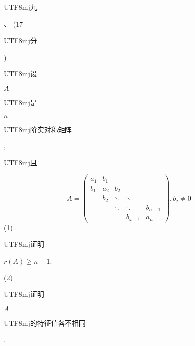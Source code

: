 \documentclass[10pt]{article}
\begin{document}
\begin{CJK}{UTF8}{mj}九\end{CJK}、 $(17$ \begin{CJK}{UTF8}{mj}分\end{CJK}) \begin{CJK}{UTF8}{mj}设\end{CJK} $A$ \begin{CJK}{UTF8}{mj}是\end{CJK} $n$ \begin{CJK}{UTF8}{mj}阶实对称矩阵\end{CJK}, \begin{CJK}{UTF8}{mj}且\end{CJK}
$$
A=\left(\begin{array}{ccccc}
a_{1} & b_{1} & & & \\
b_{1} & a_{2} & b_{2} & & \\
& b_{2} & \ddots & \ddots & \\
& & \ddots & \ddots & b_{n-1} \\
& & & b_{n-1} & a_{n}
\end{array}\right), b_{j} \neq 0
$$
(1) \begin{CJK}{UTF8}{mj}证明\end{CJK} $r(A) \geq n-1$.

(2) \begin{CJK}{UTF8}{mj}证明\end{CJK} $A$ \begin{CJK}{UTF8}{mj}的特征值各不相同\end{CJK}.
\end{document}
